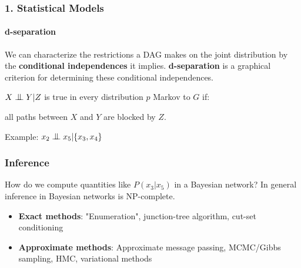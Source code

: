 \documentclass{beamer}
\newcommand{\ci}{\mathrel{\text{\scalebox{1.07}{$\perp\mkern-10mu\perp$}}}}
\begin{document}
\begin{frame}
\frametitle{1. Statistical Models}
\framesubtitle{d-separation}
We can characterize the restrictions a DAG makes on the joint distribution by the \textbf{conditional independences} it implies. \textbf{d-separation} is a graphical criterion for determining these conditional independences.

\bigskip

$X \ci Y | Z$ is true in every distribution $p$ Markov to $G$ if:

\begin{center}all paths between $X$ and $Y$ are blocked by $Z$.\end{center}

Example: $x_2 \ci x_5 | \{x_3, x_4\}$

\begin{center}
\end{center}

\end{frame}

\begin{frame}
\frametitle{Inference}
How do we compute quantities like $P(x_3|x_5)$ in a Bayesian network?
\pause
\medskip
In general inference in Bayesian networks is NP-complete.

\begin{itemize}
	\item \textbf{Exact methods}: "Enumeration", junction-tree algorithm, cut-set conditioning
	\item \textbf{Approximate methods}: Approximate message passing, MCMC/Gibbs sampling, HMC, variational methods
\end{itemize}

\end{frame}
\end{document}
